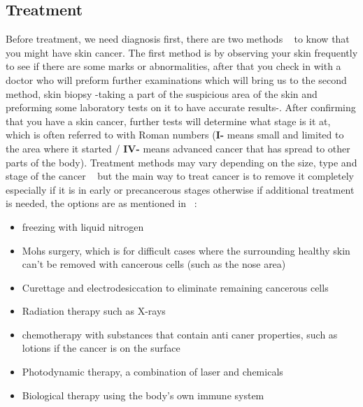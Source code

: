     \subsection{Treatment}
        Before treatment, we need diagnosis first, there are two methods ~\cite{clinic2020} to  know that you might have skin cancer. The first method is by observing your skin frequently to see if there are some marks or abnormalities, after that you check in with a doctor who will preform further examinations which will bring us to the second method, skin biopsy -taking a part of the suspicious area of the skin and preforming some laboratory tests on it to have accurate results-.
        After confirming that you have a skin cancer, further tests will determine what stage is it at, which is often referred to with Roman numbers (\textbf{I-} means small and limited to the area where it started / \textbf{IV-} means advanced cancer that has spread to other parts of the body).
        Treatment methods may vary depending on the size, type and stage of the cancer ~\cite{nhs2020} but the main way to treat cancer is to remove it completely especially if it is in early or precancerous stages otherwise if additional treatment is needed, the options are as mentioned in ~\cite{clinic2020}:
            \begin{itemize}
                \item freezing with liquid nitrogen
                \item Mohs surgery, which is for difficult cases where the surrounding healthy skin can't be removed with cancerous cells (such as the nose area)
                \item Curettage and electrodesiccation to eliminate remaining cancerous cells  
                \item Radiation therapy such as X-rays
                \item chemotherapy with substances that contain anti caner properties, such as lotions if the cancer is on the surface
                \item Photodynamic therapy, a combination of laser and chemicals 
                \item Biological therapy using the body's own immune system
            \end{itemize}

